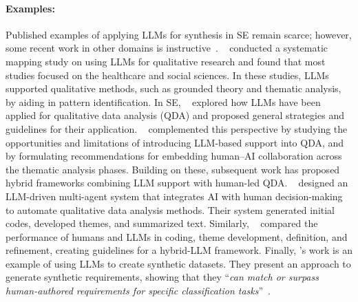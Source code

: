\documentclass[smallextended]{svjour3}
\newcommand*{\enq}[1]{\enquote{{\itshape#1}}}
\newcommand{\studytypeparagraph}[1]{\paragraph{\bfseries #1:}}
\newcommand{\studytypeparagraph}[1]{\subsubsection{#1}}
\begin{document}
\studytypeparagraph{Examples} 

Published examples of applying LLMs for synthesis in SE remain scarce; however, some recent work in other domains is instructive~\cite{DBLP:journals/ase/BanoHZT24}.
\citeauthor{DBLP:conf/wsese/BarrosANKKNB25}~\cite{DBLP:conf/wsese/BarrosANKKNB25} conducted a systematic mapping study on using LLMs for qualitative research and found that most studies focused on the healthcare and social sciences. In these studies, LLMs supported qualitative methods, such as grounded theory and thematic analysis, by aiding in pattern identification.
In SE, \citeauthor{DBLP:conf/wsese/LecaVSS25}~\cite{DBLP:conf/wsese/LecaVSS25} explored how LLMs have been applied for qualitative data analysis (QDA) and proposed general strategies and guidelines for their application. \citeauthor{DBLP:journals/corr/abs-2511-14528}~\cite{DBLP:journals/corr/abs-2511-14528} complemented this perspective by studying the opportunities and limitations of introducing LLM-based support into QDA, and by formulating recommendations for embedding human–AI collaboration across the thematic analysis phases. Building on these, subsequent work has proposed hybrid frameworks combining LLM support with human-led QDA. \citeauthor{DBLP:journals/corr/abs-2402-01386}~\cite{DBLP:journals/corr/abs-2402-01386} designed an LLM-driven multi-agent system that integrates AI with human decision-making to automate qualitative data analysis methods. Their system generated initial codes, developed themes, and summarized text. Similarly, \citeauthor{DBLP:journals/corr/abs-2510-18456}~\cite{DBLP:journals/corr/abs-2510-18456} compared the performance of humans and LLMs in coding, theme development, definition, and refinement, creating guidelines for a hybrid-LLM framework.
Finally, \citeauthor{DBLP:journals/corr/abs-2506-21138}'s work is an example of using LLMs to create synthetic datasets.
They present an approach to generate synthetic requirements, showing that they \enq{can match or surpass human-authored requirements for specific classification tasks}~\cite{DBLP:journals/corr/abs-2506-21138}.
 
\end{document}
